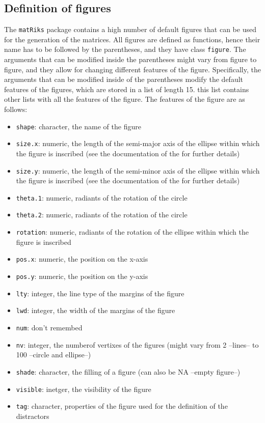 \hypertarget{definition-of-figures}{%
\subsection{Definition of figures}\label{definition-of-figures}}

The \texttt{matRiks} package contains a high number of default figures that can be used for the generation of the matrices.
All figures are defined as functions, hence their name has to be followed by the parentheses, and they have class \texttt{figure}.
The arguments that can be modified inside the parentheses might vary from figure to figure, and they allow for changing different features of the figure.
Specifically, the arguments that can be modified inside of the parentheses modify the default features of the figures, which are stored in a list of length 15. this list contains other lists with all the features of the figure.
The features of the figure are as follows:

\begin{itemize}
\tightlist
\item
  \texttt{shape}: character, the name of the figure
\item
  \texttt{size.x}: numeric, the length of the semi-major axis of the ellipse within which the figure is inscribed (see the documentation of the  for further details)
\item
  \texttt{size.y}: numeric, the length of the semi-minor axis of the ellipse within which the figure is inscribed (see the documentation of the  for further details)
\item
  \texttt{theta.1}: numeric, radiants of the rotation of the circle
\item
  \texttt{theta.2}: numeric, radiants of the rotation of the circle
\item
  \texttt{rotation}: numeric, radiants of the rotation of the ellipse within which the figure is inscribed
\item
  \texttt{pos.x}: numeric, the position on the x-axis
\item
  \texttt{pos.y}: numeric, the position on the y-axis
\item
  \texttt{lty}: integer, the line type of the margins of the figure
\item
  \texttt{lwd}: integer, the width of the margins of the figure
\item
  \texttt{num}: don't remembed
\item
  \texttt{nv}: integer, the numberof vertixes of the figures (might vary from 2 --lines-- to 100 --circle and ellipse--)
\item
  \texttt{shade}: character, the filling of a figure (can also be NA --empty figure--)
\item
  \texttt{visible}: inetger, the visibility of the figure
\item
  \texttt{tag}: character, properties of the figure used for the definition of the distractors
\end{itemize}

